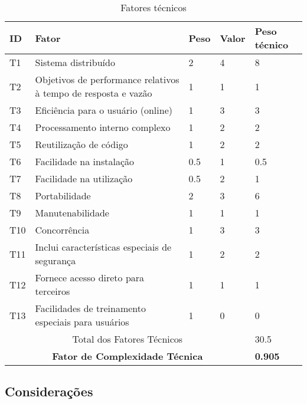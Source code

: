     \begin{table}[!h]
    \centering
    \caption{Fatores técnicos}
    \label{fatores_tecnicos}
    \begin{tabular}{l|l|l|l|l}
    \hline
    ID  & Fator                                                          & Peso & Valor & Peso técnico\\
    \hline
    T1  & Sistema distribuído                                            &  2    &  4  & 8   \\
    T2  & Objetivos de performance relativos à tempo de resposta e vazão &  1    &  1  & 1  \\
    T3  & Eficiência para o usuário (online)                             &  1    &  3  & 3  \\
    T4  & Processamento interno complexo                                 &  1    &  2  & 2  \\
    T5  & Reutilização de código                                         &  1    &  2  & 2  \\
    T6  & Facilidade na instalação                                       & 0.5   &  1  & 0.5  \\
    T7  & Facilidade na utilização                                       & 0.5   &  2  & 1  \\
    T8  & Portabilidade                                                  &  2    &  3  & 6  \\
    T9  & Manutenabilidade                                               &  1    &  1  & 1  \\
    T10 & Concorrência                                                   &  1    &  3  & 3  \\
    T11 & Inclui características especiais de segurança                  &  1    &  2  & 2  \\
    T12 & Fornece acesso direto para terceiros                           &  1    &  1  & 1  \\
    T13 & Facilidades de treinamento especiais para usuários             &  1    &  0  & 0  \\
    \hline
    \multicolumn{4}{c}{Total dos Fatores Técnicos} & 30.5\\
    \hline
    \multicolumn{4}{c}{\textbf{Fator de Complexidade Técnica}} & \textbf{0.905}\\
    \hline
    \end{tabular}
    \end{table}
  
  \subsection{Considerações}
      
